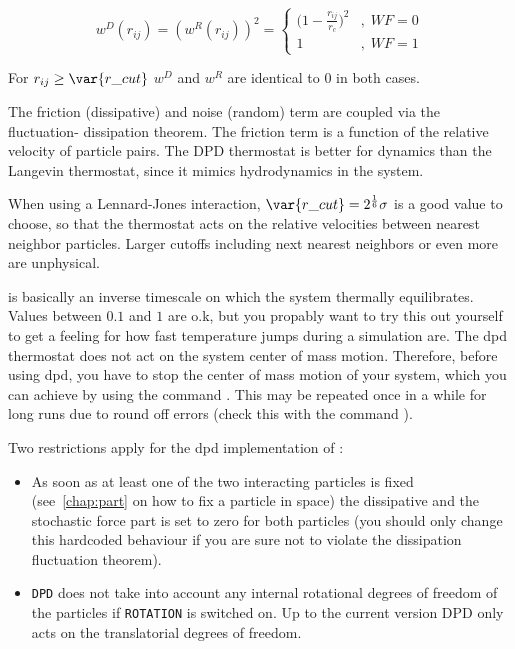 $$ 
w^D (r_{ij}) = ( w^R (r_{ij})) ^2 = 
   \left\{
   \begin{array}{clcr} 
             {( 1 - \frac{r_{ij}}{r_c}} )^2 & , \; WF = 0 \\
             1                      & , \; WF = 1
   \end{array}
   \right.
$$

For $ r_{ij} \ge \var{r\_cut} $  $w^D$ and $w^R$ are identical to 0 in both cases.

The friction (dissipative) and noise (random) term are coupled via the
fluctuation- dissipation theorem. The friction term is a function of
the relative velocity of particle pairs.  The DPD thermostat is better
for dynamics than the Langevin thermostat, since it mimics
hydrodynamics in the system.

When using a Lennard-Jones interaction, $\var{r\_cut} =
2^{\frac{1}{6}} \sigma$ is a good value to choose, so that the
thermostat acts on the relative velocities between nearest neighbor
particles.  Larger cutoffs including next nearest neighbors or even
more are unphysical.

 is basically an inverse timescale on which the system
thermally equilibrates.  Values between $0.1$ and $1$ are o.k, but you
propably want to try this out yourself to get a feeling for how fast
temperature jumps during a simulation are. The dpd thermostat does not
act on the system center of mass motion.  Therefore, before using dpd,
you have to stop the center of mass motion of your system, which you
can achieve by using the command .
 This may be
repeated once in a while for long runs due to round off errors (check
this with the command ).  

Two restrictions apply for the dpd implementation of \es:

\begin{itemize}
\item As soon as at least one of the two interacting particles is
  fixed (see~\ref{chap:part} on how to fix a particle in space) the
  dissipative and the stochastic force part is set to zero for both
  particles (you should only change this hardcoded behaviour if you
  are sure not to violate the dissipation fluctuation theorem).
\item \texttt{DPD} does not take into account any internal rotational
  degrees of freedom of the particles if \texttt{ROTATION} is switched
  on. Up to the current version DPD only acts on the translatorial
  degrees of freedom.
\end{itemize}

